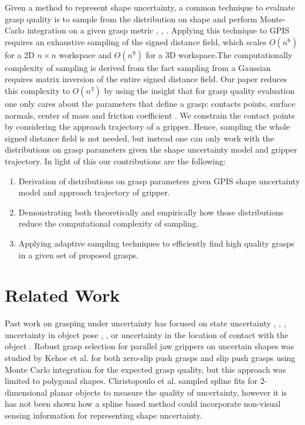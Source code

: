 \documentclass[letterpaper, 10 pt, conference]{ieeeconf}  %
\begin{document}
Given a method to represent shape uncertainty, a common technique to evaluate grasp quality is to sample from the distribution on shape and perform Monte-Carlo integration on a given grasp metric \cite{kehoe2012estimating}, \cite{kehoe2012toward}, \cite{christopoulos2007handling}. Applying this technique to GPIS requires an exhaustive sampling of the signed distance field, which scales $O(n^6)$ for a 2D $n \times n$ workspace and $O(n^9)$ for a 3D workspace.The computationally complexity of sampling is derived from the fact sampling from a Gaussian requires matrix inversion of the entire signed distance field. Our paper reduces this complexity to $O(n^3)$ by using the insight that for grasp quality evaluation one only cares about the parameters that define a grasp: contacts points, surface normals, center of mass and friction coefficient \cite{pokorny2013classical}. 
We constrain the contact points by considering the approach trajectory of a gripper.  Hence, sampling the whole signed distance field is not needed, but instead one can only work with the distributions on grasp parameters given the shape uncertainty model and gripper trajectory. In light of this our contributions are the following:
 
\begin{enumerate}
	\item Derivation of distributions on grasp parameters given GPIS shape uncertainty model and approach trajectory of gripper.%
	\item Demonstrating both theoretically and empirically how those distributions reduce the computational complexity of sampling.%
	\item Applying adaptive sampling techniques to efficiently find high quality grasps in a given set of proposed grasps. 
\end{enumerate}
 
\section{Related Work}

 Past work on grasping under uncertainty has focused on state uncertainty \cite{goldberg1990bayesian}, \cite{goldberg1990stochastic}, \cite{stulp2011learning},  uncertainty in object pose \cite{christopoulos2007handling}, \cite{felip2009robust}, \cite{kim2012physically} or uncertainty in the location of contact with the object \cite{zheng2005}. Robust grasp selection for parallel jaw grippers on uncertain shapes was studied by Kehoe et al. for both zero-slip push grasps \cite{kehoe2012toward} and slip push grasps \cite{kehoe2012estimating} using Monte Carlo integration for the expected grasp quality, but this approach was limited to polygonal shapes.  Christopoulo et al. sampled spline fits for 2-dimensional planar objects to measure the quality of uncertainty, however it is has not been shown how a spline based method could incorporate non-visual sensing information for representing shape uncertainty.
 
\end{document}
